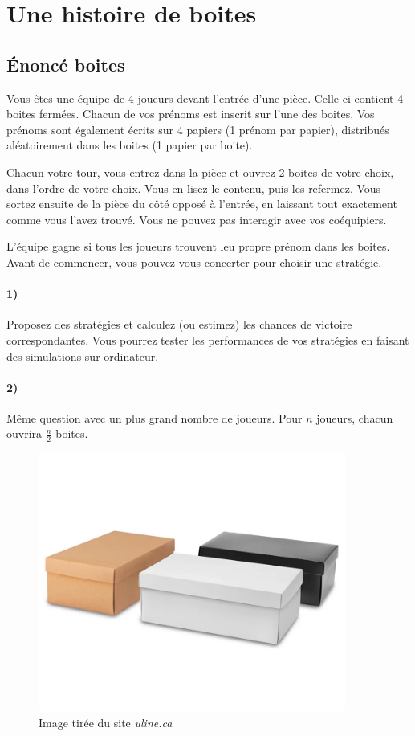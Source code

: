 \documentclass[a4paper,10pt,oneside]{article}
\begin{document}
\section{Une histoire de boites}

\subsection{Énoncé boites}

Vous êtes une équipe de 4 joueurs devant l'entrée d'une pièce. 
Celle-ci contient 4 boites fermées.
Chacun de vos prénoms est inscrit sur l'une des boites.
Vos prénoms sont également écrits sur 4 papiers (1 prénom par papier), distribués aléatoirement dans les boites (1 papier par boite).

Chacun votre tour, vous entrez dans la pièce et ouvrez 2 boites de votre choix, dans l'ordre de votre choix. 
Vous en lisez le contenu, puis les refermez.
Vous sortez ensuite de la pièce du côté opposé à l'entrée, en laissant tout exactement comme vous l'avez trouvé.
Vous ne pouvez pas interagir avec vos coéquipiers.

L'équipe gagne si tous les joueurs trouvent leu propre prénom dans les boites. Avant de commencer, vous pouvez vous concerter pour choisir une stratégie.

\paragraph*{1)}
Proposez des stratégies et calculez (ou estimez) les chances de victoire correspondantes.
Vous pourrez tester les performances de vos stratégies en faisant des simulations sur ordinateur.

\paragraph*{2)} 
Même question avec un plus grand nombre de joueurs. Pour $n$ joueurs, chacun ouvrira $\frac{n}{2}$ boites.

\vspace{3cm}
\begin{figure}[!ht]
  \centering
  \includegraphics[width=0.9\textwidth]{figures/boites.png}
  \caption{Image tirée du site \textit{uline.ca}}
\end{figure}
\end{document}
